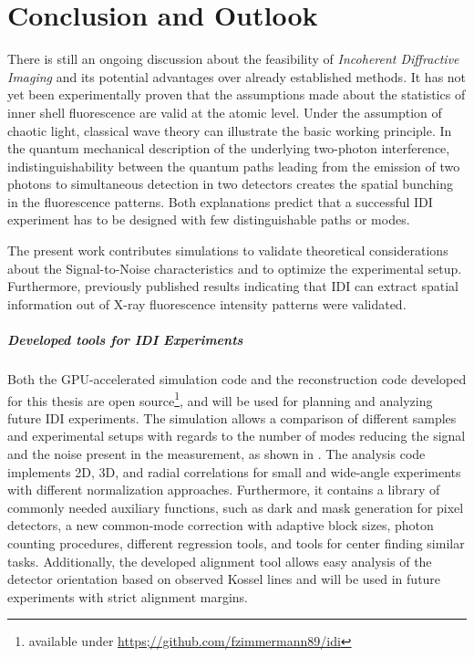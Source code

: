 \chapter{Conclusion and Outlook}
There is still an ongoing discussion about the feasibility of \textit{Incoherent Diffractive Imaging} and its potential advantages over already established methods. It has not yet been experimentally proven that the assumptions made about the statistics of inner shell fluorescence are valid at the atomic level. Under the assumption of chaotic light, classical wave theory can illustrate the basic working principle.  In the quantum mechanical description of the underlying two-photon interference, indistinguishability between the quantum paths leading from the emission of two photons to simultaneous detection in two detectors creates the spatial bunching in the fluorescence patterns. Both explanations predict that a successful IDI experiment has to be designed with few distinguishable paths or modes.

The present work contributes simulations to validate theoretical considerations about the Signal-to-Noise characteristics and to optimize the experimental setup. Furthermore, previously published results indicating that IDI can extract spatial information out of X-ray fluorescence intensity patterns were validated.

\paragraph{Developed tools for IDI Experiments}
Both the GPU-accelerated simulation code and the reconstruction code developed for this thesis are open source\footnote{available under \url{https;//github.com/fzimmermann89/idi}}, and will be used for planning and analyzing future IDI experiments. The simulation allows a comparison of different samples and experimental setups with regards to the number of modes reducing the signal and the noise present in the measurement, as shown in .
The analysis code implements 2D, 3D, and radial correlations for small and wide-angle experiments with different normalization approaches. Furthermore, it contains a library of commonly needed auxiliary functions, such as dark and mask generation for pixel detectors, a new common-mode correction with adaptive block sizes, photon counting procedures, different regression tools, and tools for center finding similar tasks.
Additionally, the developed alignment tool allows easy analysis of the detector orientation based on observed Kossel lines and will be used in future experiments with strict alignment margins.

